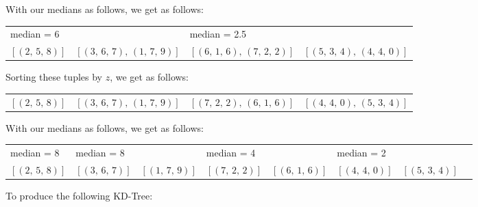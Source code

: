 \documentclass[12pt]{scrartcl}
\begin{document}
With our medians as follows, we get as follows:

\begin{table}[H]
    \centering
    \begin{tabular}{llll}
        median = 6    &                          & median = 2.5             &                          \\
        $[(2,\, 5,\, 8)]$ & $[(3,\, 6,\, 7),\, (1,\, 7,\, 9)]$ & $[(6,\, 1,\, 6),\, (7,\, 2,\, 2)]$ & $[(5,\, 3,\, 4),\, (4,\, 4,\, 0)]$ \\
    \end{tabular}
\end{table}

Sorting these tuples by $z$, we get as follows:

\begin{table}[H]
    \centering
    \begin{tabular}{llll}
        $[(2,\, 5,\, 8)]$ & $[(3,\, 6,\, 7),\, (1,\, 7,\, 9)]$ & $[(7,\, 2,\, 2),\, (6,\, 1,\, 6)]$ & $[(4,\, 4,\, 0),\, (5,\, 3,\, 4)]$ \\
    \end{tabular}
\end{table}

With our medians as follows, we get as follows:


\begin{table}[H]
    \centering
    \begin{tabular}{llllllll}
        median = 8        & median = 8        &                   & median = 4        &                   & median = 2        &               \\
        $[(2,\, 5,\, 8)]$ & $[(3,\, 6,\, 7)]$ & $[(1,\, 7,\, 9)]$ & $[(7,\, 2,\, 2)]$ & $[(6,\, 1,\, 6)]$ & $[(4,\, 4,\, 0)]$ & $[(5,\, 3,\, 4)]$ \\
    \end{tabular}
\end{table}

To produce the following KD-Tree:
\end{document}
